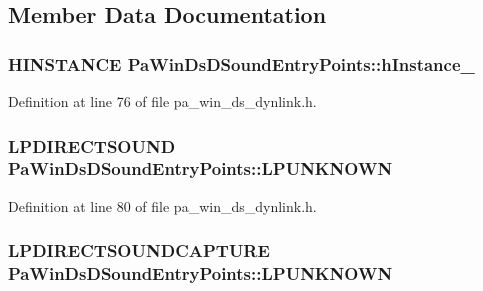 \subsection{Member Data Documentation}
\subsubsection[{\texorpdfstring{h\+Instance\+\_\+}{hInstance_}}]{\setlength{\rightskip}{0pt plus 5cm}H\+I\+N\+S\+T\+A\+N\+CE Pa\+Win\+Ds\+D\+Sound\+Entry\+Points\+::h\+Instance\+\_\+}\hypertarget{struct_pa_win_ds_d_sound_entry_points_a12e5a69dc9a16a7d948fbc858cae0bd2}{}\label{struct_pa_win_ds_d_sound_entry_points_a12e5a69dc9a16a7d948fbc858cae0bd2}


Definition at line 76 of file pa\+\_\+win\+\_\+ds\+\_\+dynlink.\+h.

\subsubsection[{\texorpdfstring{L\+P\+U\+N\+K\+N\+O\+WN}{LPUNKNOWN}}]{ L\+P\+D\+I\+R\+E\+C\+T\+S\+O\+U\+ND Pa\+Win\+Ds\+D\+Sound\+Entry\+Points\+::\+L\+P\+U\+N\+K\+N\+O\+WN}\hypertarget{struct_pa_win_ds_d_sound_entry_points_a23545cb5a6490da21b2ac9e88e1829c9}{}\label{struct_pa_win_ds_d_sound_entry_points_a23545cb5a6490da21b2ac9e88e1829c9}


Definition at line 80 of file pa\+\_\+win\+\_\+ds\+\_\+dynlink.\+h.

\subsubsection[{\texorpdfstring{L\+P\+U\+N\+K\+N\+O\+WN}{LPUNKNOWN}}]{\setlength{\rightskip}{0pt plus 5cm}L\+P\+D\+I\+R\+E\+C\+T\+S\+O\+U\+N\+D\+C\+A\+P\+T\+U\+RE Pa\+Win\+Ds\+D\+Sound\+Entry\+Points\+::\+L\+P\+U\+N\+K\+N\+O\+WN}\hypertarget{struct_pa_win_ds_d_sound_entry_points_ae99a88997cf56c4207a6dd36af608e59}{}\label{struct_pa_win_ds_d_sound_entry_points_ae99a88997cf56c4207a6dd36af608e59}


